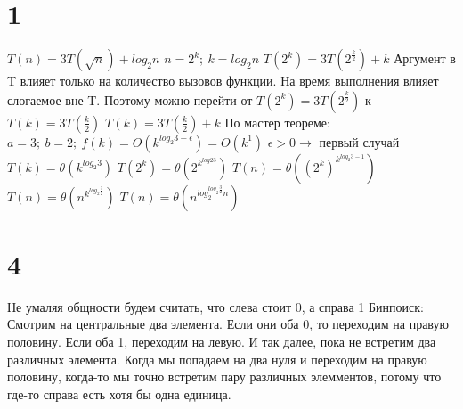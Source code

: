 \documentclass[12pt]{extarticle}
\begin{document}
\section*{1}
$T(n) = 3T(\sqrt{n}) + log_2 n$ \newline
$n = 2^k;\ k = log_2 n$ \newline
$T(2^k) = 3T(2^{\frac{k}{2}}) + k$ \newline
Аргумент в T влияет только на количество вызовов функции. На время выполнения влияет слогаемое вне T. Поэтому можно перейти от $T(2^k) = 3T(2^{\frac{k}{2}})$ к $T(k) = 3T(\frac{k}{2})$ \newline
$T(k) = 3T(\frac{k}{2}) + k$ \newline
По мастер теореме: \newline
$a = 3;\ b = 2;\ f(k) = O(k^{log_2 3 - \epsilon}) = O(k^1)$ \newline
$\epsilon > 0 \rightarrow$ первый случай \newline
$T(k) = \theta(k^{log_2 3})$ \newline
$T(2^k) = \theta(2^{k^{log2 3}})$ \newline
$T(n) = \theta((2^k)^{k^{log_2 3 - 1}})$ \newline
$T(n) = \theta(n^{k^{log_2 \frac{3}{2}}})$ \newline
$T(n) = \theta(n^{log_2^{log_2 \frac{3}{2}} n})$


\section*{4}
Не умаляя общности будем считать, что слева стоит 0, а справа 1\newline
Бинпоиск: \newline
Смотрим на центральные два элемента. Если они оба 0, то переходим на правую половину. Если оба 1, переходим на левую. И так далее, пока не встретим два различных элемента.\newline
Когда мы попадаем на два нуля и переходим на правую половину, когда-то мы точно встретим пару различных элемментов, потому что где-то справа есть хотя бы одна единица.
\end{document}
